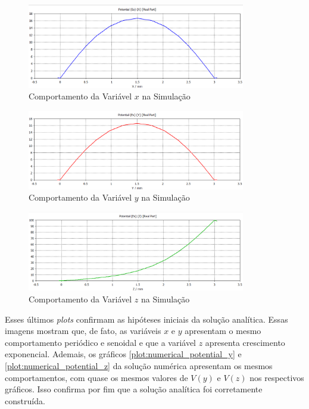 \documentclass{report}
\begin{document}
\begin{figure}[h!]
  \centering
  \includegraphics[width=0.85\textwidth]{images/plots/simulation_potential_x.png}
  \caption{\label{plot:simul_potential_x} Comportamento da Variável $ x $ na Simulação}
\end{figure}

\begin{figure}[h!]
  \centering
  \includegraphics[width=0.85\textwidth]{images/plots/simulation_potential_y.png}
  \caption{\label{plot:simul_potential_y} Comportamento da Variável $ y $ na Simulação}
\end{figure}

\begin{figure}[h!]
  \centering
  \includegraphics[width=0.85\textwidth]{images/plots/simulation_potential_z.png}
  \caption{\label{plot:simul_potential_z} Comportamento da Variável $ z $ na Simulação}
\end{figure}

Esses últimos \textit{plots} confirmam as hipóteses iniciais da solução analítica. Essas imagens mostram que,
de fato, as variáveis $ x $ e $ y $ apresentam o mesmo comportamento periódico e senoidal e que a variável $ z $
apresenta crescimento exponencial. Ademais, os gráficos \ref{plot:numerical_potential_y} e \ref{plot:numerical_potential_z}
da solução numérica apresentam os mesmos comportamentos, com quase os mesmos valores de $ V(y) $ e $ V(z) $ nos respectivos gráficos. Isso confirma por fim que
a solução analítica foi corretamente construída.
\end{document}
